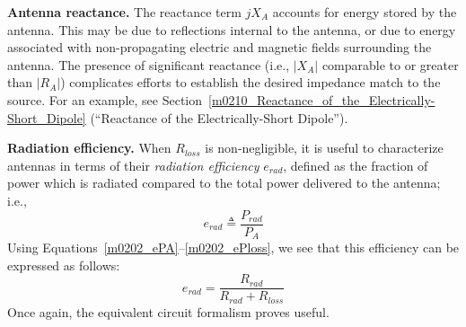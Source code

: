 {\bf Antenna reactance.}
The reactance term $jX_A$ accounts for energy stored by the antenna.
This may be due to reflections internal to the antenna, or due to energy associated with non-propagating electric and magnetic fields surrounding the antenna.  The presence of significant reactance (i.e., $\left|X_A\right|$ comparable to or greater than $\left|R_A \right|$) complicates efforts to establish the desired impedance match to the source.
For an example, see Section~\ref{m0210_Reactance_of_the_Electrically-Short_Dipole} (``Reactance of the Electrically-Short Dipole'').

{\bf Radiation efficiency.}
When $R_{loss}$ is non-negligible, it is useful to characterize antennas in terms of their \emph{radiation efficiency} $e_{rad}$, defined as the fraction of power which is radiated compared to the total power delivered to the antenna; i.e.,
%
\begin{equation}
e_{rad} \triangleq \frac{P_{rad}}{P_A}
\end{equation}
%
Using Equations~\ref{m0202_ePA}--\ref{m0202_ePloss}, we see that this efficiency can be expressed as follows:
%
\begin{equation}
e_{rad} = \frac{R_{rad}}{R_{rad}+R_{loss}}
\label{m0202_eRE}
\end{equation}
%
Once again, the equivalent circuit formalism proves useful.


